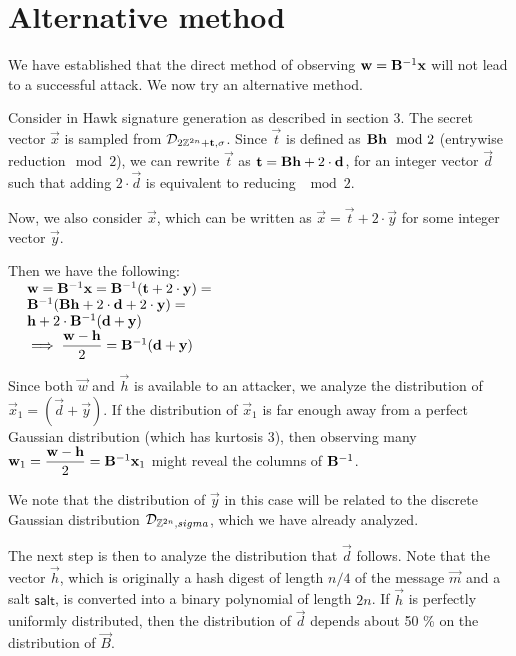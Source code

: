 \chapter{Alternative method}

We have established that the direct method of observing $\mathbf{w} = \mathbf{B}^{-1} \mathbf{x}$ will not lead to a successful attack.
We now try an alternative method.

Consider in Hawk signature generation as described in section 3.
The secret vector $\vec{x}$ is sampled from $\mathcal{D}_{2\mathbb{Z}^{2n} + \mathbf{t}, \sigma}$.
Since $\vec{t}$ is defined as $\mathbf{B}\mathbf{h}\mod 2$ (entrywise reduction$\mod 2$), we can rewrite $\vec{t}$ as $\mathbf{t} = \mathbf{B} \mathbf{h} + 2 \cdot \mathbf{d}$, 
for an integer vector $\vec{d}$ such that adding $2 \cdot \vec{d}$ is equivalent to reducing $\mod 2$.

Now, we also consider $\vec{x}$, which can be written as $\vec{x} = \vec{t} + 2 \cdot \vec{y}$ for some integer vector $\vec{y}$.

Then we have the following: \\ 
$\ \ \ \ \mathbf{w} = \mathbf{B}^{-1} \mathbf{x} = \mathbf{B}^{-1}(\mathbf{t} + 2 \cdot \mathbf{y}) =$ \\
$\ \ \ \ \mathbf{B}^{-1}(\mathbf{B} \mathbf{h} + 2 \cdot \mathbf{d} + 2 \cdot \mathbf{y}) =$ \\
$\ \ \ \ \mathbf{h} + 2\cdot \mathbf{B}^{-1}(\mathbf{d} + \mathbf{y}) $\\ 
$\ \ \ \ \implies \mathlarger{ \frac{\vec{w} - \vec{h}}{2}} = \mat{B}^{-1}(\vec{d} + \vec{y})$

Since both $\vec{w}$ and $\vec{h}$ is available to an attacker, we analyze the distribution of $\vec{x}_1 = (\vec{d} + \vec{y})$.
If the distribution of $\vec{x}_1$ is far enough away from a perfect Gaussian distribution (which has kurtosis 3), then observing many $\vec{w}_1 = \mathlarger{ \frac{\vec{w} - \vec{h}}{2}} = \mat{B}^{-1} \vec{x}_1$
might reveal the columns of $\mathbf{B}^{-1}$.

We note that the distribution of $\vec{y}$ in this case will be related to the discrete Gaussian distribution $\mathcal{D}_{\mathbb{Z}^{2n}, sigma}$, which we have already analyzed.

The next step is then to analyze the distribution that $\vec{d}$ follows. Note that the vector $\vec{h}$, which is originally a hash digest of length $n / 4$ of the message $\vec{m}$ and a salt $\mathsf{salt}$, is converted into
a binary polynomial of length $2n$. If $\vec{h}$ is perfectly uniformly distributed, then the distribution of $\vec{d}$ depends about 50 \% on the distribution of $\vec{B}$.

